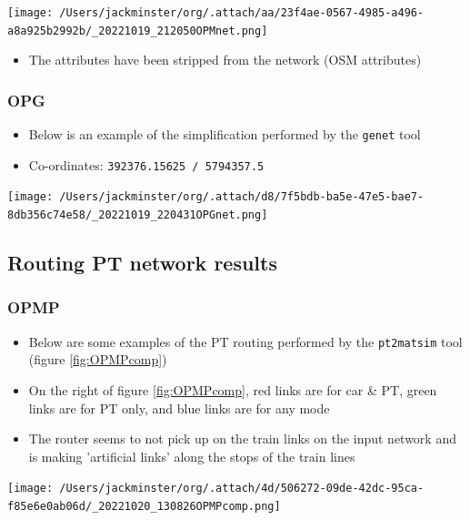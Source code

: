 \documentclass[11pt]{article}
\begin{document}
\begin{center}
\texttt{[image: /Users/jackminster/org/.attach/aa/23f4ae-0567-4985-a496-a8a925b2992b/\_20221019\_212050OPMnet.png]}
\end{center}

\begin{itemize}
\item The attributes have been stripped from the network (OSM attributes)
\end{itemize}
\subsubsection{OPG}
\label{sec:orga9abeaa}
\begin{itemize}
\item Below is an example of the simplification performed by the \texttt{genet} tool
\item Co-ordinates: \texttt{392376.15625 / 5794357.5}
\end{itemize}

\begin{center}
\texttt{[image: /Users/jackminster/org/.attach/d8/7f5bdb-ba5e-47e5-bae7-8db356c74e58/\_20221019\_220431OPGnet.png]}
\end{center}
\subsection{Routing PT network results}
\label{sec:org1e2016c}
\subsubsection{OPMP}
\label{sec:org645126d}
\begin{itemize}
\item Below are some examples of the PT routing performed by the \texttt{pt2matsim} tool (figure \ref{fig:OPMPcomp})
\item On the right of figure \ref{fig:OPMPcomp}, red links are for car \& PT, green links are for PT only, and blue links are for any mode
\item The router seems to not pick up on the train links on the input network and is making 'artificial links' along the stops of the train lines
\end{itemize}

\begin{center}
\texttt{[image: /Users/jackminster/org/.attach/4d/506272-09de-42dc-95ca-f85e6e0ab06d/\_20221020\_130826OPMPcomp.png]}
\end{center}
\end{document}
